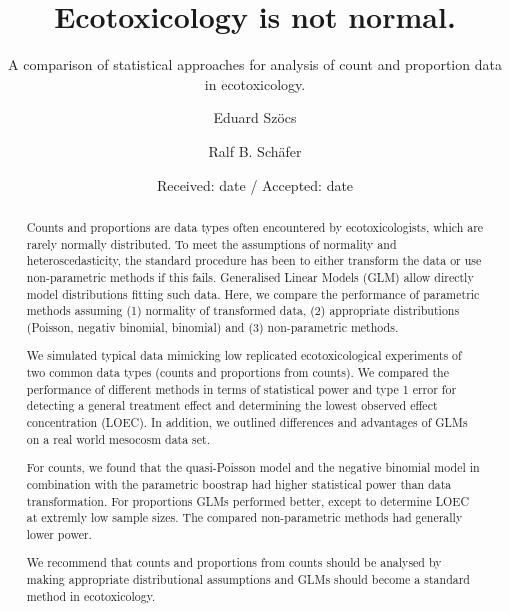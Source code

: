\documentclass[twocolumn, natbib]{svjour3}
\title{Ecotoxicology is not normal.}
\subtitle{A comparison of statistical approaches for analysis of count and proportion data in ecotoxicology.}
\author{Eduard Szöcs \and Ralf B. Schäfer}
\institute{Eduard Szöcs \envelope  and Ralf B. Schäfer \at
Institute for Environmental Sciences \\
University Koblenz-Landau \\
Fortstraße 7, \\
76829 Landau, Germany \\
Tel.: +49 06341 280 31552 \\
\email{szoecs@uni-landau.de}
}
\date{Received: date / Accepted: date}
\begin{document}
\sloppy
\maketitle

\begin{abstract}
Counts and proportions are data types often encountered by ecotoxicologists, which are rarely normally distributed.
To meet the assumptions of normality and heteroscedasticity, the standard procedure has been to either transform the data or use non-parametric methods if this fails.
Generalised Linear Models (GLM) allow directly model distributions fitting such data.
Here, we compare the performance of parametric methods assuming (1) normality of transformed data, (2) appropriate distributions (Poisson, negativ binomial, binomial) and (3) non-parametric methods.

We simulated typical data mimicking low replicated ecotoxicological experiments of two common data types (counts and proportions from counts). 
We compared the performance of different methods in terms of statistical power and type 1 error for detecting a general treatment effect and determining the lowest observed effect concentration (LOEC).
In addition, we outlined differences and advantages of GLMs on a real world mesocosm data set.

For counts, we found that the quasi-Poisson model and the negative binomial model in combination with the parametric boostrap had higher statistical power than data transformation.
For proportions GLMs performed better, except to determine LOEC at extremly low sample sizes.
The compared non-parametric methods had generally lower power.

We recommend that counts and proportions from counts should be analysed by making appropriate distributional assumptions and GLMs should become a standard method in ecotoxicology.
\end{abstract}



\end{document}
